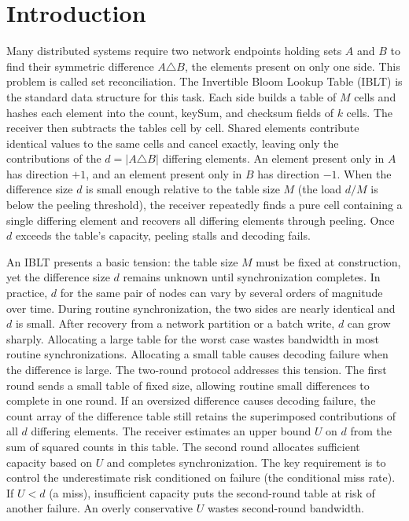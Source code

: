 \section{Introduction}\label{sec:intro}
Many distributed systems require two network endpoints holding sets $A$ and $B$ to find their symmetric difference $A\triangle B$, the elements present on only one side. This problem is called set reconciliation. The Invertible Bloom Lookup Table (IBLT)\cite{gm,eppstein2011whatsdifference} is the standard data structure for this task. Each side builds a table of $M$ cells and hashes each element into the count, keySum, and checksum fields of $k$ cells. The receiver then subtracts the tables cell by cell. Shared elements contribute identical values to the same cells and cancel exactly, leaving only the contributions of the $d=|A\triangle B|$ differing elements. An element present only in $A$ has direction $+1$, and an element present only in $B$ has direction $-1$. When the difference size $d$ is small enough relative to the table size $M$ (the load $d/M$ is below the peeling threshold), the receiver repeatedly finds a pure cell containing a single differing element and recovers all differing elements through peeling. Once $d$ exceeds the table's capacity, peeling stalls and decoding fails.

An IBLT presents a basic tension: the table size $M$ must be fixed at construction, yet the difference size $d$ remains unknown until synchronization completes. In practice, $d$ for the same pair of nodes can vary by several orders of magnitude over time. During routine synchronization, the two sides are nearly identical and $d$ is small. After recovery from a network partition or a batch write, $d$ can grow sharply. Allocating a large table for the worst case wastes bandwidth in most routine synchronizations. Allocating a small table causes decoding failure when the difference is large. The two-round protocol\cite{wu2026selfsizing} addresses this tension. The first round sends a small table of fixed size, allowing routine small differences to complete in one round. If an oversized difference causes decoding failure, the count array of the difference table still retains the superimposed contributions of all $d$ differing elements. The receiver estimates an upper bound $U$ on $d$ from the sum of squared counts in this table. The second round allocates sufficient capacity based on $U$ and completes synchronization. The key requirement is to control the underestimate risk conditioned on failure (the conditional miss rate). If $U<d$ (a miss), insufficient capacity puts the second-round table at risk of another failure. An overly conservative $U$ wastes second-round bandwidth.

